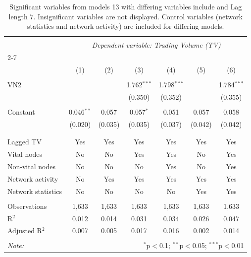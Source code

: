 
\begin{table}[!htbp] \centering 
  \caption{Significant variables from models 13 with differing variables include 
                               and Lag length 7. Insignificant variables are not displayed. 
                               Control variables (network statistics and network activity) are 
                               included for differing models.} 
  \label{Volumemodels1_t} 
\scriptsize 
\begin{tabular}{@{\extracolsep{5pt}}lcccccc} 
\\[-1.8ex]\hline 
\hline \\[-1.8ex] 
 & \multicolumn{6}{c}{\textit{Dependent variable: Trading Volume (TV)}} \\ 
\cline{2-7} 
\\[-1.8ex] & (1) & (2) & (3) & (4) & (5) & (6)\\ 
\hline \\[-1.8ex] 
 VN2 &  &  & 1.762$^{***}$ & 1.798$^{***}$ &  & 1.784$^{***}$ \\ 
  &  &  & (0.350) & (0.352) &  & (0.355) \\ 
  & & & & & & \\ 
 Constant & 0.046$^{**}$ & 0.057 & 0.057$^{*}$ & 0.051 & 0.057 & 0.058 \\ 
  & (0.020) & (0.035) & (0.035) & (0.037) & (0.042) & (0.042) \\ 
  & & & & & & \\ 
\hline \\[-1.8ex] 
Lagged TV & Yes & Yes & Yes & Yes & Yes & Yes \\ 
Vital nodes & No & No & Yes & Yes & No & Yes \\ 
Non-vital nodes & No & No & No & Yes & No & Yes \\ 
Network activity & No & Yes & Yes & Yes & Yes & Yes \\ 
Network statistics & No & No & No & No & Yes & Yes \\ 
\hline &  &  &  &  &  &  \\ 
Observations & 1,633 & 1,633 & 1,633 & 1,633 & 1,633 & 1,633 \\ 
R$^{2}$ & 0.012 & 0.014 & 0.031 & 0.034 & 0.026 & 0.047 \\ 
Adjusted R$^{2}$ & 0.007 & 0.005 & 0.017 & 0.016 & 0.002 & 0.014 \\ 
\hline 
\hline \\[-1.8ex] 
\textit{Note:}  & \multicolumn{6}{r}{$^{*}$p$<$0.1; $^{**}$p$<$0.05; $^{***}$p$<$0.01} \\ 
\end{tabular} 
\end{table} 
